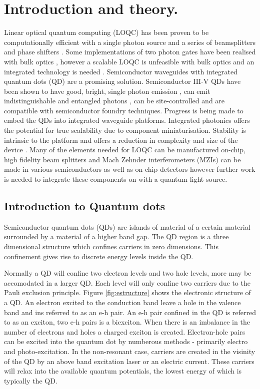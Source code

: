 
 \chapter{Introduction and theory.}

Linear optical quantum computing (LOQC) has been proven to be computationally
efficient with a single photon source and a series of beamsplitters and phase
shifters \cite{knill2001scheme}. Some implementations of two photon gates have
been realised with bulk optics \cite{o2003demonstration}, however a scalable
LOQC is unfeasible with bulk optics and an integrated technology is needed
\cite{carolan2015universal}. Semiconductor waveguides with integrated quantum
dots (QD) are a promising solution. Semiconductor III-V QDs have been shown to
have good, bright, single photon emission \cite{Bennett:05}, can emit
indistinguishable and entangled photons \cite{he2013demand,stevenson2012}, can
be site-controlled \cite{juska2013towards} and are compatible with semiconductor
foundry techniques. Progress is being made to embed the QDs into integrated
waveguide platforms. Integrated photonics offers the potential for true
scalability due to component miniaturisation. Stability is intrinsic to the
platform and offers a reduction in complexity and size of the device
\cite{politi2009integrated}. Many of the elements needed for LOQC can be
manufactured on-chip, high fidelity beam splitters and Mach Zehnder
interferometers (MZIs) can be made in various semiconductors
\cite{wang2014gallium, zhang2011, politi2008silica} as well as on-chip detectors
\cite{gerrits2011chip, hadfield2009single} however further work is needed to
integrate these components on with a quantum light source.

\section{Introduction to Quantum dots}

Semiconductor quantum dots (QDs) are islands of material of a certain material
surrounded by a material of a higher band gap. The QD region is a three
dimensional structure which confines carriers in zero dimensions. This
confinement gives rise to discrete energy levels inside the QD.

Normally a QD will confine two electron levels and two hole levels, more may be
accomodated in a larger QD. Each level will only confine two carriers due to the
Pauli exclusion principle. Figure \ref{fig:estructure} shows the electronic
structure of a QD. An electron excited to the conduction band leave a hole in
the valence band and ins referred to as an e-h pair. An e-h pair confined in the
QD is referred to as an exciton, two e-h pairs is a biexciton. When there is an
imbalance in the number of electrons and holes a charged exciton is created.
Electron-hole pairs can be excited into the quantum dot by numberous methods -
primarily electro and photo-excitation. In the non-resonant case, carriers are
created in the visinity of the QD by an above band excitation laser or an
electric current. These carriers will relax into the available quantum
potentials, the lowest energy of which is typically the QD.

